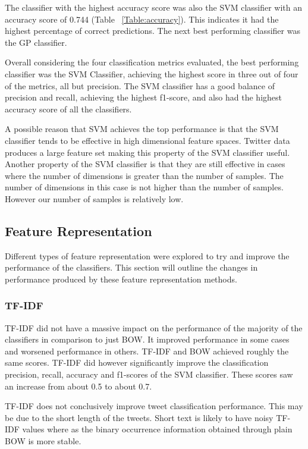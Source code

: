 The classifier with the highest accuracy score was also the SVM classifier with an accuracy score of 0.744 (Table ~\ref{Table:accuracy}). This indicates it had the highest percentage of correct predictions. The next best performing classifier was the GP classifier.

Overall considering the four classification metrics evaluated, the best performing classifier was the SVM Classifier, achieving the highest score in three out of four of the metrics, all but precision. The SVM classifier has a good balance of precision and recall, achieving the highest f1-score, and also had the highest accuracy score of all the classifiers.

A possible reason that SVM achieves the top performance is that the SVM classifier tends to be effective in high dimensional feature spaces. Twitter data produces a large feature set making this property of the SVM classifier useful. Another property of the SVM classifier is that they are still effective in cases where the number of dimensions is greater than the number of samples. The number of dimensions in this case is not higher than the number of samples. However our number of samples is relatively low.

\subsection{Feature Representation}

Different types of feature representation were explored to try and improve the performance of the classifiers. This section will outline the changes in performance produced by these feature representation methods. 

\subsubsection*{TF-IDF}
TF-IDF did not have a massive impact on the performance of the majority of the classifiers in comparison to just BOW. It improved performance in some cases and worsened performance in others. TF-IDF and BOW achieved roughly the same scores. TF-IDF did however significantly improve the classification precision, recall, accuracy and f1-scores of the SVM classifier. These scores saw an increase from about 0.5 to about 0.7.

TF-IDF does not conclusively improve tweet classification performance. This may be due to the short length of the tweets. Short text is likely to have noisy TF-IDF values where as the binary occurrence information obtained through plain BOW is more stable.

